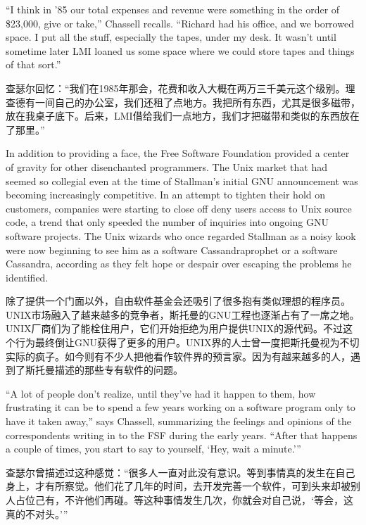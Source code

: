 \ifdefined\eng
``I think in '85 our total expenses and revenue were something in the order of \$23,000, give or take,'' Chassell recalls. ``Richard had his office, and we borrowed space. I put all the stuff, especially the tapes, under my desk. It wasn't until sometime later LMI loaned us some space where we could store tapes and things of that sort.''
\fi

\ifdefined\chs
查瑟尔回忆：``我们在1985年那会，花费和收入大概在两万三千美元这个级别。理查德有一间自己的办公室，我们还租了点地方。我把所有东西，尤其是很多磁带，放在我桌子底下。后来，LMI借给我们一点地方，我们才把磁带和类似的东西放在了那里。''
\fi

\ifdefined\eng
In addition to providing a face, the Free Software Foundation provided a center of gravity for other disenchanted programmers. The Unix market that had seemed so collegial even at the time of Stallman's initial GNU announcement was becoming increasingly competitive. In an attempt to tighten their hold on customers, companies were starting to \ifdefined\vone close off \fi\ifdefined\vtwo deny \fi users access to Unix source code, a trend that only speeded the number of inquiries into ongoing GNU software projects. The Unix wizards who once regarded Stallman as a noisy kook were now beginning to see him as a software \ifdefined\vone Cassandra\fi\ifdefined\vtwo prophet or a software Cassandra, according as they felt hope or despair over escaping the problems he identified\fi.
\fi

\ifdefined\chs
除了提供一个门面以外，自由软件基金会还吸引了很多抱有类似理想的程序员。UNIX市场融入了越来越多的竞争者，斯托曼的GNU工程也逐渐占有了一席之地。UNIX厂商们为了能栓住用户，它们开始拒绝为用户提供UNIX的源代码。不过这个行为最终倒让GNU获得了更多的用户。UNIX界的人士曾一度把斯托曼视为不切实际的疯子。如今则有不少人把他看作软件界的预言家。\ifdefined\vtwo 因为有越来越多的人，遇到了斯托曼描述的那些专有软件的问题。\fi
\fi

\ifdefined\eng
``A lot of people don't realize, until they've had it happen to them, how frustrating it can be to spend a few years working on a software program only to have it taken away,'' says Chassell, summarizing the feelings and opinions of the correspondents writing in to the FSF during the early years. ``After that happens a couple of times, you start to say to yourself, `Hey, wait a minute.'\hspace{0.01in}''
\fi

\ifdefined\chs
查瑟尔曾描述过这种感觉：``很多人一直对此没有意识。等到事情真的发生在自己身上，才有所察觉。他们花了几年的时间，去开发完善一个软件，可到头来却被别人占位己有，不许他们再碰。等这种事情发生几次，你就会对自己说，`等会，这真的不对头。'\hspace{0.01in}''
\fi

